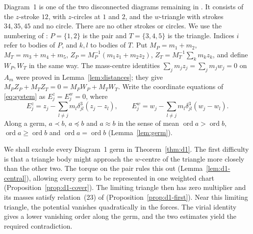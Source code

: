 \documentclass[11pt]{amsart}
\theoremstyle{definition}
\theoremstyle{remark}
\newcommand{\ord}{\operatorname{ord}}
\begin{document}
{Diagram~1 is one of the two disconnected diagrams remaining in \cite[\S7.1, p.~565]{AK}.
It consists of the $z$-stroke $12$, with $z$-circles at $1$ and $2$, and the $w$-triangle
with strokes $34,35,45$ and no circle.  There are no other strokes or circles.
We use the numbering of \cite[\S8.1]{AK}: $P=\{1,2\}$ is the pair and $T=\{3,4,5\}$ is the
triangle.  Indices $i$ refer to bodies of $P$, and $k,l$ to bodies of $T$.  Put
$M_P=m_1+m_2$, $M_T=m_3+m_4+m_5$, $Z_P=M_P^{-1}(m_1z_1+m_2z_2)$,
$Z_T=M_T^{-1}\sum_km_kz_k$, and define $W_P,W_T$ in the same way.  The mass-centre identities
$\sum_jm_jz_j=\sum_jm_jw_j=0$ on $A_m$ were proved in Lemma~\ref{lem:distances}; they give
$M_PZ_P+M_TZ_T=0=M_PW_P+M_TW_T$.  Write the coordinate equations of \eqref{eq:system} as
$E^z_j=E^w_j=0$, where}
\[
  E^z_j=z_j-\sum_{l\ne j}m_l\delta_{jl}^3(z_j-z_l),\qquad
  E^w_j=w_j-\sum_{l\ne j}m_l\delta_{jl}^3(w_j-w_l).
\]
Along a germ, $a\prec b$, $a\preccurlyeq b$ and $a\approx b$ in the sense of \cite[\S3]{AK} mean
$\ord a>\ord b$, $\ord a\ge\ord b$ and $\ord a=\ord b$ (Lemma~\ref{lem:germ}).

{We shall exclude every Diagram~1 germ in Theorem~\ref{thm:d1}.
The first difficulty is that a triangle body might approach the $w$-centre of the triangle
more closely than the other two.  The torque on the pair rules this out
(Lemma~\ref{lem:d1-central}), allowing every germ to be represented in one weighted chart
(Proposition~\ref{prop:d1-cover}).  The limiting triangle then has zero multiplier and its
masses satisfy relation~(23) of \cite[\S8.1]{AK} (Proposition~\ref{prop:d1-first}).
Near this limiting triangle, the potential vanishes quadratically in the forces.
The virial identity gives a lower vanishing order along the germ, and the two estimates
yield the required contradiction.}
\end{document}
